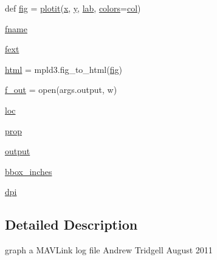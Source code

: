 \begin{DoxyCompactItemize}
\item 
def \mbox{\hyperlink{namespacepymavlink_1_1tools_1_1mavgraph_ac18c2a234fcdd0957038c08ead266890}{fig}} = \mbox{\hyperlink{namespacepymavlink_1_1tools_1_1mavgraph_ac4c25ed1ed8661bb69619e15992c1c81}{plotit}}(\mbox{\hyperlink{namespacepymavlink_1_1tools_1_1mavgraph_a850833f299bc2444a4e9077175f357cb}{x}}, \mbox{\hyperlink{namespacepymavlink_1_1tools_1_1mavgraph_a2083829da277f3d120e2db2239c5ede9}{y}}, \mbox{\hyperlink{namespacepymavlink_1_1tools_1_1mavgraph_a2dd273e216f57a44b6274cb7f46b22dc}{lab}}, \mbox{\hyperlink{namespacepymavlink_1_1tools_1_1mavgraph_a19862d005460bc9f0c104743009a0ff1}{colors}}=\mbox{\hyperlink{namespacepymavlink_1_1tools_1_1mavgraph_af6bb70f02b9d6d3eaab8b0a303c984ed}{col}})
\item 
\mbox{\hyperlink{namespacepymavlink_1_1tools_1_1mavgraph_adb9a481f4250de10d9aca7414ed5a50f}{fname}}
\item 
\mbox{\hyperlink{namespacepymavlink_1_1tools_1_1mavgraph_ab68f03b772845d4aaac6c4694b8dfd4d}{fext}}
\item 
\mbox{\hyperlink{namespacepymavlink_1_1tools_1_1mavgraph_a0177eb20ccaa0775cf9fe35f8733252e}{html}} = mpld3.\+fig\+\_\+to\+\_\+html(\mbox{\hyperlink{namespacepymavlink_1_1tools_1_1mavgraph_ac18c2a234fcdd0957038c08ead266890}{fig}})
\item 
\mbox{\hyperlink{namespacepymavlink_1_1tools_1_1mavgraph_a2c2895972745d7c66e968c45f5b997ae}{f\+\_\+out}} = open(args.\+output, \textquotesingle{}w\textquotesingle{})
\item 
\mbox{\hyperlink{namespacepymavlink_1_1tools_1_1mavgraph_a2df6fa1e6eceda8d7c102aef24d0dbd1}{loc}}
\item 
\mbox{\hyperlink{namespacepymavlink_1_1tools_1_1mavgraph_a2ba79cea22b05cac13b0a1873526359b}{prop}}
\item 
\mbox{\hyperlink{namespacepymavlink_1_1tools_1_1mavgraph_a73cb0e108dbf9cebc0071578e1ee24d2}{output}}
\item 
\mbox{\hyperlink{namespacepymavlink_1_1tools_1_1mavgraph_a2205030986d0f4e395eae2699c316ce6}{bbox\+\_\+inches}}
\item 
\mbox{\hyperlink{namespacepymavlink_1_1tools_1_1mavgraph_a4a1f0f211bdcf7fa63db57c19a3d4080}{dpi}}
\end{DoxyCompactItemize}


\subsection{Detailed Description}
\begin{DoxyVerb}graph a MAVLink log file
Andrew Tridgell August 2011
\end{DoxyVerb}
 

